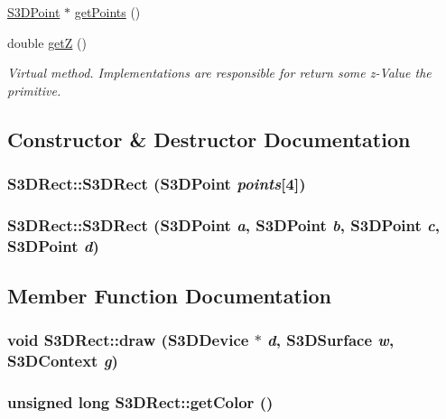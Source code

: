 \begin{DoxyCompactItemize}
\hyperlink{class_s3_d_point}{S3DPoint} $\ast$ \hyperlink{class_s3_d_rect_a626b39ee85c2ab329258bba6ee0ac255}{getPoints} ()
\item 
double \hyperlink{class_s3_d_rect_a7b3fb925a55d8a22a354829d6a5afa3d}{getZ} ()
\begin{DoxyCompactList}\small\item\em Virtual method. Implementations are responsible for return some z-\/Value the primitive. \item\end{DoxyCompactList}\end{DoxyCompactItemize}


\subsection{Constructor \& Destructor Documentation}
\hypertarget{class_s3_d_rect_a30160c448c675829ced3c254a01ccb6e}{
\subsubsection[{S3DRect}]{\setlength{\rightskip}{0pt plus 5cm}S3DRect::S3DRect ({\bf S3DPoint} {\em points}\mbox{[}4\mbox{]})}}
\label{class_s3_d_rect_a30160c448c675829ced3c254a01ccb6e}
\hypertarget{class_s3_d_rect_adfec4ab2501bd4cfef0f5fd82d769942}{
\subsubsection[{S3DRect}]{\setlength{\rightskip}{0pt plus 5cm}S3DRect::S3DRect ({\bf S3DPoint} {\em a}, \/  {\bf S3DPoint} {\em b}, \/  {\bf S3DPoint} {\em c}, \/  {\bf S3DPoint} {\em d})}}
\label{class_s3_d_rect_adfec4ab2501bd4cfef0f5fd82d769942}


\subsection{Member Function Documentation}
\hypertarget{class_s3_d_rect_adfa6596cc2a62c83709f0f3a040333c1}{
\subsubsection[{draw}]{\setlength{\rightskip}{0pt plus 5cm}void S3DRect::draw ({\bf S3DDevice} $\ast$ {\em d}, \/  {\bf S3DSurface} {\em w}, \/  {\bf S3DContext} {\em g})}}
\label{class_s3_d_rect_adfa6596cc2a62c83709f0f3a040333c1}
\hypertarget{class_s3_d_rect_adbf17caac29e632afb9f380e3821a256}{
\subsubsection[{getColor}]{\setlength{\rightskip}{0pt plus 5cm}unsigned long S3DRect::getColor ()}}
\label{class_s3_d_rect_adbf17caac29e632afb9f380e3821a256}


